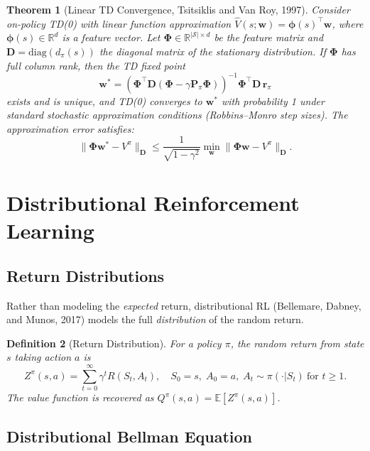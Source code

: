 \documentclass[11pt,a4paper]{article}
\newtheorem{theorem}{Theorem}[section]
\newtheorem{definition}[theorem]{Definition}
\newcommand{\E}{\mathbb{E}}
\newcommand{\R}{\mathbb{R}}
\newcommand{\cS}{\mathcal{S}}
\newcommand{\Vpi}{V^{\pi}}
\newcommand{\Qpi}{Q^{\pi}}
\begin{document}
\begin{theorem}[Linear TD Convergence, Tsitsiklis and Van Roy, 1997]
\label{thm:linear-td}
Consider on-policy TD(0) with linear function approximation $\hat{V}(s; \mathbf{w}) = \boldsymbol{\phi}(s)^\top \mathbf{w}$,
where $\boldsymbol{\phi}(s) \in \R^d$ is a feature vector. Let $\mathbf{\Phi} \in \R^{|\cS| \times d}$ be the feature
matrix and $\mathbf{D} = \mathrm{diag}(d_\pi(s))$ the diagonal matrix of the stationary distribution.
If $\mathbf{\Phi}$ has full column rank, then the TD fixed point
\[
  \mathbf{w}^* = (\mathbf{\Phi}^\top \mathbf{D} (\mathbf{\Phi} - \gamma \mathbf{P}_\pi \mathbf{\Phi}))^{-1} \mathbf{\Phi}^\top \mathbf{D}\, \mathbf{r}_\pi
\]
exists and is unique, and TD(0) converges to $\mathbf{w}^*$ with probability 1 under
standard stochastic approximation conditions (Robbins--Monro step sizes). The
approximation error satisfies:
\[
  \|\mathbf{\Phi} \mathbf{w}^* - \Vpi\|_{\mathbf{D}} \leq \frac{1}{\sqrt{1 - \gamma^2}} \min_{\mathbf{w}} \|\mathbf{\Phi} \mathbf{w} - \Vpi\|_{\mathbf{D}}.
\]
\end{theorem}


\section{Distributional Reinforcement Learning}
\label{sec:distributional}

\subsection{Return Distributions}

Rather than modeling the \emph{expected} return, distributional RL (Bellemare, Dabney, and Munos, 2017)
models the full \emph{distribution} of the random return.

\begin{definition}[Return Distribution]
For a policy $\pi$, the random return from state $s$ taking action $a$ is
\[
  Z^\pi(s, a) = \sum_{t=0}^\infty \gamma^t R(S_t, A_t), \quad S_0 = s,\; A_0 = a,\; A_{t} \sim \pi(\cdot | S_t)\ \text{for } t \geq 1.
\]
The value function is recovered as $\Qpi(s,a) = \E[Z^\pi(s,a)]$.
\end{definition}

\subsection{Distributional Bellman Equation}
\end{document}

